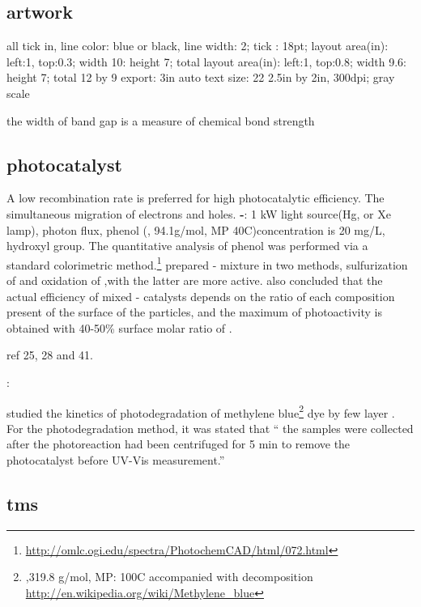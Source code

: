 

\subsection{artwork}

 all tick in, line color: blue or black, line width: 2; tick : 18pt;
 layout area(in): left:1, top:0.3; width 10: height 7; total
 layout area(in): left:1, top:0.8; width 9.6: height 7; total 12 by 9
 export: 3in auto
 text size: 22
2.5in by 2in, 300dpi; gray scale

the width of band gap is a measure of chemical bond strength

\subsection{photocatalyst}
A low recombination rate is preferred for high photocatalytic efficiency. The simultaneous migration of electrons and holes.
\textbf{-}: 1 kW light source(Hg, or Xe lamp), photon flux, phenol (, 94.1g/mol, MP 40C)concentration is 20 mg/L, hydroxyl group. The quantitative analysis of phenol was performed via a standard colorimetric method.\footnote{\url{http://omlc.ogi.edu/spectra/PhotochemCAD/html/072.html}}
\citeauthor{DiPaola1999} prepared - mixture in two methods, sulfurization of  and oxidation of ,with the latter are more active.
\citeauthor{DiPaola1999} also concluded that the actual efficiency of mixed - catalysts depends on the ratio of each composition present of the surface of the particles, and the maximum of photoactivity is obtained with 40-50\% surface molar ratio of .

ref 25, 28 and 41.

\textbf{}:

\citeauthor{Sreedhara2013} studied the kinetics of photodegradation of methylene blue\footnote{,319.8 g/mol, MP: 100C accompanied with decomposition \url{http://en.wikipedia.org/wiki/Methylene_blue}} dye by few layer .
For the photodegradation method, it was stated that `` the samples were collected after the photoreaction had been centrifuged for 5 min to remove the photocatalyst before UV-Vis measurement.''
\subsection{tms}

